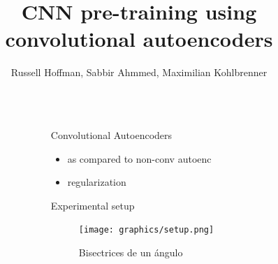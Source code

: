 \documentclass[final]{beamer}
\title{CNN pre-training using convolutional autoencoders} %
\author{Russell Hoffman, Sabbir Ahmmed, Maximilian Kohlbrenner } %
\institute{TU Berlin} %
\newlength{\sepwid}
\newlength{\onecolwid}
\begin{document}

\setlength{\belowcaptionskip}{2ex} %
\setlength\belowdisplayshortskip{2ex} %

\begin{frame}[t] %

\begin{columns}[t] %

\begin{column}{\sepwid}\end{column} %

\begin{column}{\onecolwid} %


\begin{block}{Convolutional Autoencoders}

\begin{itemize}
	\item as compared to non-conv autoenc
	\item regularization
\end{itemize}

\end{block}


\begin{block}{Experimental setup}

\begin{figure}
\texttt{[image: graphics/setup.png]}
\caption{Bisectrices de un ángulo}
\end{figure}

\end{block}



\end{column}
\end{columns}
\end{frame}
\end{document}
